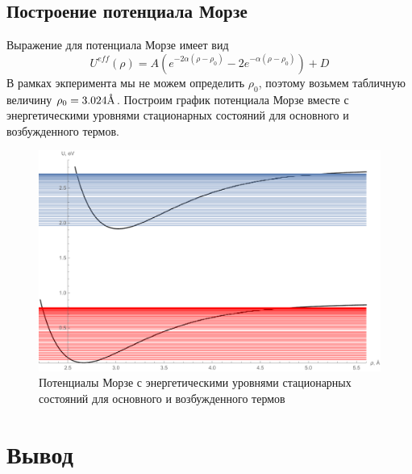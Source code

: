 \documentclass[a4paper, 12pt]{article}
\newcommand{\angstrom}{\textup{\AA}}
\begin{document}
\subsection{Построение потенциала Морзе}
Выражение для потенциала Морзе имеет вид
\begin{equation*}
	U^{eff}(\rho)=A(e^{-2\alpha(\rho-\rho_0)}-2e^{-\alpha(\rho-\rho_0)})+D
\end{equation*}
В рамках экперимента мы не можем определить $\rho_0$, поэтому возьмем табличную величину $\rho_0=3.024\angstrom$. Построим график потенциала Морзе вместе с энергетическими уровнями стационарных состояний для основного и возбужденного термов.
\begin{figure}[!htb]
\centering
\includegraphics[width=\textwidth]{plot10.pdf}
\caption{Потенциалы Морзе с энергетическими уровнями стационарных состояний для основного и возбужденного термов}
\end{figure}
\section{Вывод}
\end{document}
